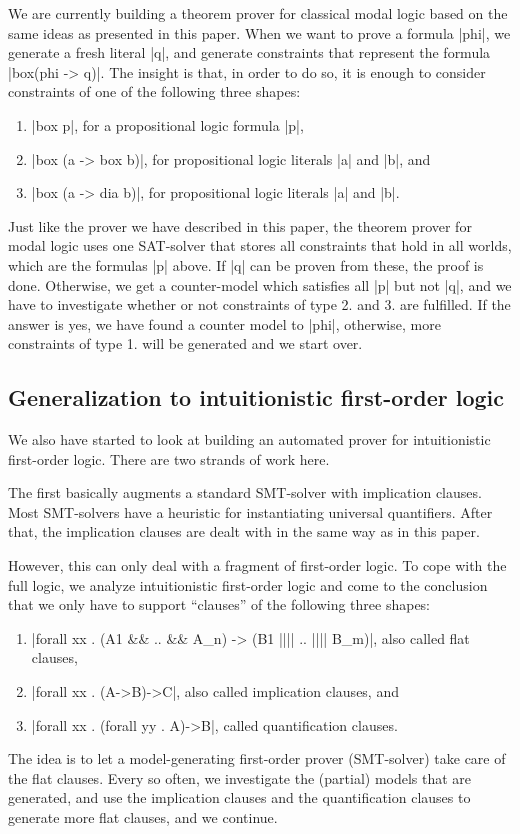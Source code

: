 \documentclass{llncs}
\begin{document}
We are currently building a theorem prover for classical modal logic based on the same ideas as presented in this paper. When we want to prove a formula |phi|, we generate a fresh literal |q|, and generate constraints that represent the formula |box(phi -> q)|. The insight is that, in order to do so, it is enough to consider constraints of one of the following three shapes:
\begin{enumerate}
\item |box p|, for a propositional logic formula |p|,
\item |box (a -> box b)|, for propositional logic literals |a| and |b|, and
\item |box (a -> dia b)|, for propositional logic literals |a| and |b|.
\end{enumerate}
Just like the prover we have described in this paper, the theorem prover for modal
logic uses one SAT-solver that stores all constraints that hold in all worlds, which are the formulas |p| above. If |q| can be proven from these, the proof is done. Otherwise, we get a counter-model which satisfies all |p| but not |q|, and we have to investigate whether or not constraints of type 2. and 3. are fulfilled. If the answer is yes, we have found a counter model to |phi|, otherwise, more constraints of type 1. will be generated and we start over.

\subsection{Generalization to intuitionistic first-order logic}

We also have started to look at building an automated prover for intuitionistic first-order logic. There are two strands of work here.

The first basically augments a standard SMT-solver with implication clauses. Most SMT-solvers have a heuristic for instantiating universal quantifiers. After that, the implication clauses are dealt with in the same way as in this paper.

However, this can only deal with a fragment of first-order logic. To cope with the full logic,
we analyze intuitionistic first-order logic and come to the conclusion that we only have to support ``clauses'' of the following three shapes:
\begin{enumerate}
\item |forall xx . (A1 && .. && A_n) -> (B1 |||| .. |||| B_m)|, also called flat clauses,
\item |forall xx . (A->B)->C|, also called implication clauses, and
\item |forall xx . (forall yy . A)->B|, called quantification clauses.
\end{enumerate}
The idea is to let a model-generating first-order prover (SMT-solver) take care of the flat clauses. Every so often, we investigate the (partial) models that are generated, and use the implication clauses and the quantification clauses to generate more flat clauses, and we continue.
\end{document}
